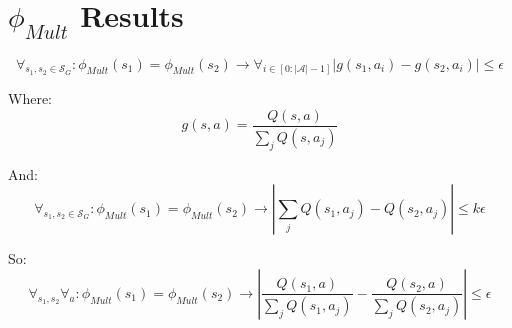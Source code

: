 \documentclass[11pt]{amsart}
\begin{document}
%
%
%

\newpage
\section{$\phi_{Mult}$ Results}

\begin{equation}
\forall_{s_1, s_2 \in \mathcal{S}_G} : \phi_{Mult}(s_1) = \phi_{Mult}(s_2) \rightarrow \forall_{i \in [0:|\mathcal{A}| - 1]} | g(s_1, a_i) - g(s_2, a_i) | \leq \epsilon
\label{eq:phi_mult}
\end{equation}

Where:
\begin{equation}
g(s,a) = \frac{Q(s,a)}{\sum_j Q(s,a_j)}
\end{equation}

And:
\begin{equation}
\forall_{s_1, s_2 \in \mathcal{S}_G} : \phi_{Mult}(s_1) = \phi_{Mult}(s_2) \rightarrow |\sum_j Q(s_1,a_j) - Q(s_2,a_j) | \leq k\epsilon
\end{equation}

So:
\begin{equation}
\forall_{s_1,s_2} \forall_a : \phi_{Mult}(s_1) = \phi_{Mult}(s_2) \rightarrow | \frac{Q(s_1,a)}{\sum_j Q(s_1,a_j)} - \frac{Q(s_2,a)}{\sum_j Q(s_2,a_j)} | \leq \epsilon
\end{equation}
\end{document}
